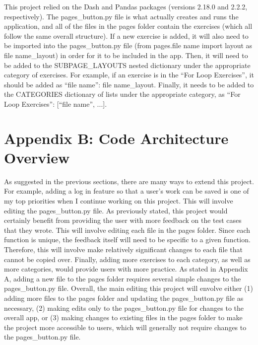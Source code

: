 \documentclass[10pt,twocolumn]{article}
\begin{document}
This project relied on the Dash \cite{Dash} and Pandas packages (versions 2.18.0 and 2.2.2, respectively). The pages\_button.py file is what actually creates and runs the application, and all of the files in the pages folder contain the exercises (which all follow the same overall structure). If a new exercise is added, it will also need to be imported into the pages\_button.py file (from pages.file name import layout as file name\_layout) in order for it to be included in the app. Then, it will need to be added to the SUBPAGE\_LAYOUTS nested dictionary under the appropriate category of exercises. For example, if an exercise is in the \enquote{For Loop Exercises}, it should be added as \enquote{file name}: file name\_layout. Finally, it needs to be added to the CATEGORIES dictionary of lists under the appropriate category, as \enquote{For Loop Exercises}: [\enquote{file name}, ...].

\section{Appendix B: Code Architecture Overview}

As suggested in the previous sections, there are many ways to extend this project. For example, adding a log in feature so that a user's work can be saved is one of my top priorities when I continue working on this project. This will involve editing the pages\_button.py file. As previously stated, this project would certainly benefit from providing the user with more feedback on the test cases that they wrote. This will involve editing each file in the pages folder. Since each function is unique, the feedback itself will need to be specific to a given function. Therefore, this will involve make relatively significant changes to each file that cannot be copied over. Finally, adding more exercises to each category, as well as more categories, would provide users with more practice. As stated in Appendix A, adding a new file to the pages folder requires several simple changes to the pages\_button.py file. Overall, the main editing this project will envolve either (1) adding more files to the pages folder and updating the pages\_button.py file as necessary, (2) making edits only to the pages\_button.py file for changes to the overall app, or (3) making changes to existing files in the pages folder to make the project more accessible to users, which will generally not require changes to the pages\_button.py file.
\end{document}
